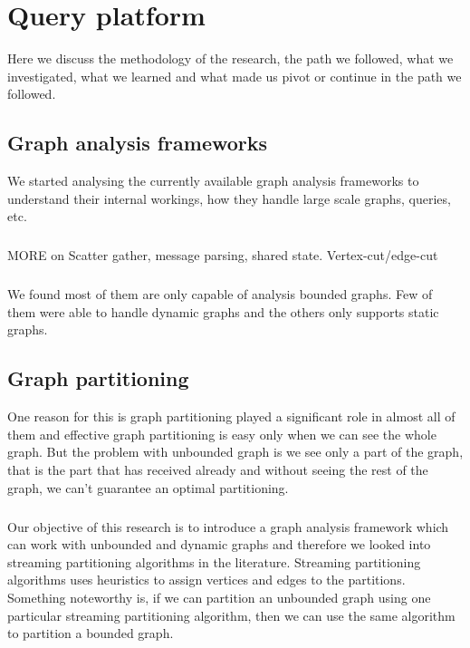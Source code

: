 \documentclass[12pt]{report}
\numberwithin{figure}{section}
\numberwithin{table}{section}
\begin{document}
\chapter{Query platform}

Here we discuss the methodology of the research, the path we followed, what we investigated, what we learned and what made us pivot or continue in the path we followed.

\section{Graph analysis frameworks}
We started analysing the currently available graph analysis frameworks to understand their internal workings, how they handle large scale graphs, queries, etc.

\paragraph{}

MORE on Scatter gather,  message parsing, shared state. Vertex-cut/edge-cut 

\paragraph{}

We found most of them are only capable of analysis bounded graphs. Few of them were able to handle dynamic graphs and the others only supports static graphs. 

\section{Graph partitioning}
One reason for this is graph partitioning played a significant role in almost all of them and effective graph partitioning is easy only when we can see the whole graph. But the problem with unbounded graph is we see only a part of the graph, that is the part that has received already and without seeing the rest of the graph, we can’t guarantee an optimal partitioning.
 
\paragraph{}

Our objective of this research is to introduce a graph analysis framework which can work with unbounded and dynamic graphs and therefore we looked into streaming partitioning algorithms in the literature. Streaming partitioning algorithms uses heuristics to assign vertices and edges to the partitions. Something noteworthy is, if we can partition an unbounded graph using one particular streaming partitioning algorithm, then we can use the same algorithm to partition a bounded graph.
 
\end{document}
